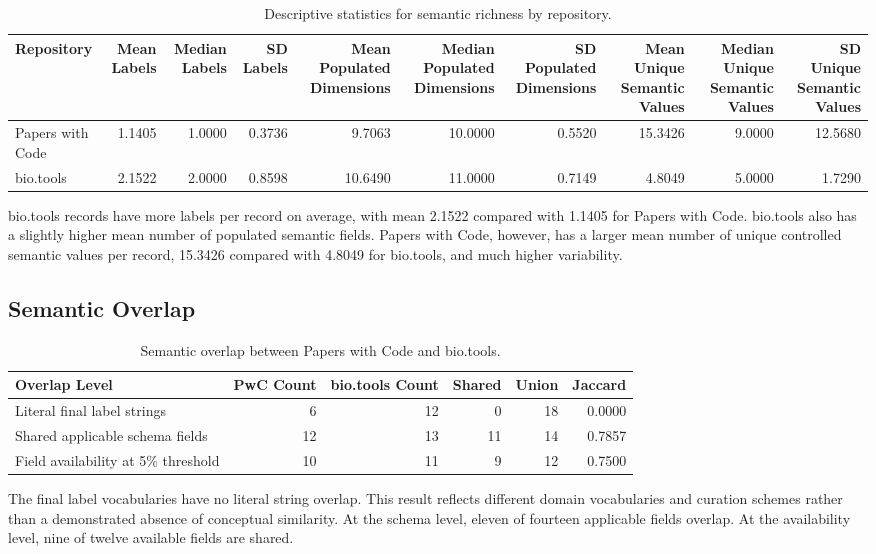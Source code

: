 \documentclass[pdflatex,sn-mathphys-num]{sn-jnl}%
\theoremstyle{thmstyleone}%
\theoremstyle{thmstyletwo}%
\theoremstyle{thmstylethree}%
\begin{document}
\begin{table}[htbp]
\centering
\scriptsize
\caption{Descriptive statistics for semantic richness by repository.}
\label{tab:semantic-richness-descriptive-statistics}
\setlength{\tabcolsep}{3pt}
\begin{tabular}{lrrrrrrrrr}
\toprule
Repository & Mean Labels & Median Labels & SD Labels & Mean Populated Dimensions & Median Populated Dimensions & SD Populated Dimensions & Mean Unique Semantic Values & Median Unique Semantic Values & SD Unique Semantic Values \\
\midrule
Papers with Code & 1.1405 & 1.0000 & 0.3736 & 9.7063 & 10.0000 & 0.5520 & 15.3426 & 9.0000 & 12.5680 \\
bio.tools & 2.1522 & 2.0000 & 0.8598 & 10.6490 & 11.0000 & 0.7149 & 4.8049 & 5.0000 & 1.7290 \\
\bottomrule
\end{tabular}
\end{table}

bio.tools records have more labels per record on average, with mean 2.1522 compared with 1.1405 for Papers with Code. bio.tools also has a slightly higher mean number of populated semantic fields. Papers with Code, however, has a larger mean number of unique controlled semantic values per record, 15.3426 compared with 4.8049 for bio.tools, and much higher variability.

\subsection{Semantic Overlap}
\label{subsec:semantic-overlap}

\begin{table}[htbp]
\centering
\small
\caption{Semantic overlap between Papers with Code and bio.tools.}
\label{tab:semantic-overlap-summary}
\begin{tabular}{lrrrrr}
\toprule
Overlap Level & PwC Count & bio.tools Count & Shared & Union & Jaccard \\
\midrule
Literal final label strings & 6 & 12 & 0 & 18 & 0.0000 \\
Shared applicable schema fields & 12 & 13 & 11 & 14 & 0.7857 \\
Field availability at 5\% threshold & 10 & 11 & 9 & 12 & 0.7500 \\
\bottomrule
\end{tabular}
\end{table}

The final label vocabularies have no literal string overlap. This result reflects different domain vocabularies and curation schemes rather than a demonstrated absence of conceptual similarity. At the schema level, eleven of fourteen applicable fields overlap. At the availability level, nine of twelve available fields are shared.
\end{document}
